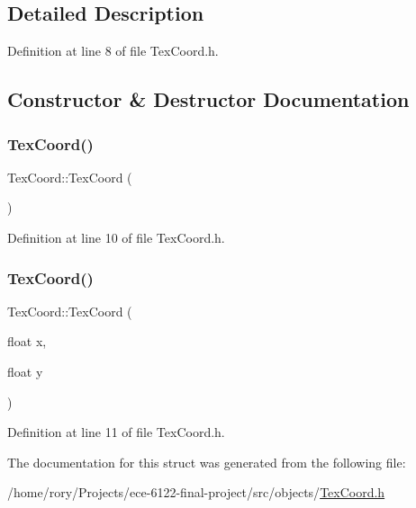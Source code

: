 \subsection{Detailed Description}


Definition at line 8 of file Tex\+Coord.\+h.



\subsection{Constructor \& Destructor Documentation}
\mbox{\label{struct_tex_coord_ae1167f68dab931cc523e1f74fa5ad206}} 
\subsubsection{\texorpdfstring{Tex\+Coord()}{TexCoord()}\hspace{0.1cm}{\footnotesize\ttfamily [1/2]}}
{\footnotesize\ttfamily Tex\+Coord\+::\+Tex\+Coord (\begin{DoxyParamCaption}{ }\end{DoxyParamCaption})\hspace{0.3cm}{\ttfamily [inline]}}



Definition at line 10 of file Tex\+Coord.\+h.

\mbox{\label{struct_tex_coord_a02018ed90402d77cb313b581c0ea0561}} 
\subsubsection{\texorpdfstring{Tex\+Coord()}{TexCoord()}\hspace{0.1cm}{\footnotesize\ttfamily [2/2]}}
{\footnotesize\ttfamily Tex\+Coord\+::\+Tex\+Coord (\begin{DoxyParamCaption}\item[{float}]{x,  }\item[{float}]{y }\end{DoxyParamCaption})\hspace{0.3cm}{\ttfamily [inline]}}



Definition at line 11 of file Tex\+Coord.\+h.



The documentation for this struct was generated from the following file\+:\begin{DoxyCompactItemize}
\item 
/home/rory/\+Projects/ece-\/6122-\/final-\/project/src/objects/\hyperlink{_tex_coord_8h}{Tex\+Coord.\+h}\end{DoxyCompactItemize}
